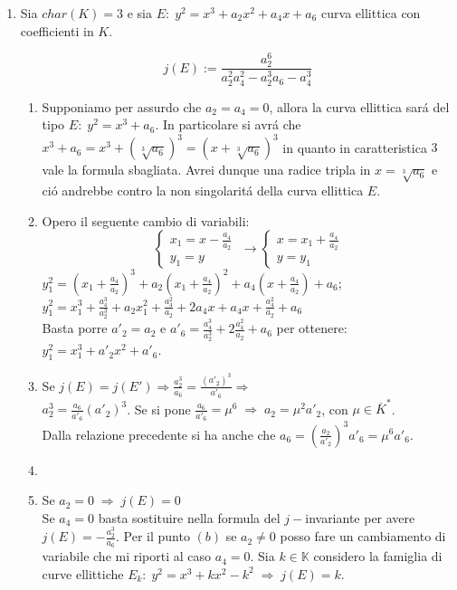 \documentclass[a4paper]{article}
\newcommand{\sist}{\begin{cases}}
\newcommand{\esist}{\end{cases}}
\newcommand{\ds}{\displaystyle}
\begin{document}
\begin{enumerate}
\item Sia $char(K)=3$ e sia $E:\; y^2=x^3+a_2x^2+a_4x+a_6$ curva ellittica con coefficienti in $K$.

$$j(E):=\ds{\frac{a_2^6}{a_2^2a_4^2-a_2^3a_6-a_4^3}}$$
\begin{enumerate}
\item Supponiamo per assurdo che $a_2=a_4=0$, allora la curva ellittica sar\'a del tipo 
$E:\;y^2=x^3+a_6$. In particolare si avr\'a che $x^3+a_6=x^3+\left(\sqrt[3]{a_6}\right)^3=(x+\sqrt[3]{a_6})^3$ in quanto in caratteristica $3$ vale la formula sbagliata. Avrei dunque una radice tripla in $x=\sqrt[3]{a_6}$ e
ci\'o andrebbe contro la non singolarit\'a della curva ellittica $E$.
\item Opero il seguente cambio di variabili:
$$
\sist
x_1=x-\ds{\frac{a_4}{a_2}}\\
y_1=y
\esist
\;\rightarrow
\sist
x=x_1+\ds{\frac{a_4}{a_2}}\\
y=y_1
\esist
$$
$\ds{y_1^2=\left(x_1+\frac{a_4}{a_2}\right)^3+a_2\left(x_1+\frac{a_4}{a_2}\right)^2+a_4\left(x+\frac{a_4}{a_2}\right)+a_6}$;\\
$y_1^2=x_1^3+\frac{a_4^3}{a_2^3}+a_2x_1^2+\frac{a_4^2}{a_2}+2a_4 x+a_4 x+ \frac{a_4^2}{a_2}+a_6$\\
Basta porre $a'_2=a_2$ e $a'_6=\frac{a_4^3}{a_2^3}+2\frac{a_4^2}{a_2}+a_6$ per ottenere:\\
$y_1^2=x_1^3+a'_2x^2+a'_6$.





\item Se $j(E)=j(E')\Rightarrow \ds{\frac{a_2^3}{a_6}=\frac{(a'_2)^3}{a'_6}\Rightarrow}$\\
$a_2^3=\ds{\frac{a_6}{a'_6}(a'_2)^3}$. Se si pone $\frac{a_6}{a'_6}=\mu^6\;\Rightarrow\; a_2=\mu^2a'_2$,
con $\mu\in\overline{K}^*$.\\
Dalla relazione precedente si ha anche che $a_6=\left(\frac{a_2}{a'_2}\right)^3a'_6=\mu^6a'_6$.

\item

\item Se $a_2=0\;\Rightarrow\;j(E)=0$\\
Se $a_4=0$ basta sostituire nella formula del $j-$invariante per avere $j(E)=-\ds{\frac{a_2^3}{a_6}}$.
Per il punto $(b)$ se $a_2\neq 0$ posso fare un cambiamento di variabile che mi riporti al caso $a_4=0$.
Sia $k\in \mathbb{K}$ considero la famiglia di curve ellittiche 
$E_k:\; y^2=x^3+kx^2-k^2\;\Rightarrow\; j(E)=k$.


\end{enumerate}
\end{enumerate}
\end{document}
